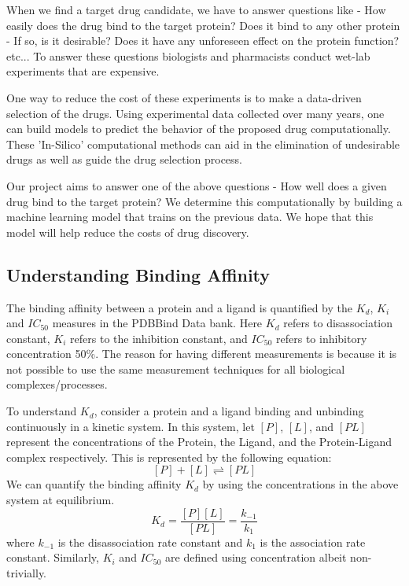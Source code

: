 \documentclass[11pt]{article}
\begin{document}
When we find a target drug candidate, we have to answer questions like - How easily does the drug bind to the target protein? Does it bind to any other protein - If so, is it desirable? Does it have any unforeseen effect on the protein function? etc...  To answer these questions biologists and pharmacists conduct wet-lab experiments that are expensive.

One way to reduce the cost of these experiments is to make a data-driven selection of the drugs.  Using experimental data collected over many years, one can build models to predict the behavior of the proposed drug computationally.  These 'In-Silico' computational methods can aid in the elimination of undesirable drugs as well as guide the drug selection process.

Our project aims to answer one of the above questions - How well does a given drug bind to the target protein? We determine this computationally by building a machine learning model that trains on the previous data.  We hope that this model will help reduce the costs of drug discovery. 

\subsection{Understanding Binding Affinity}
The binding affinity between a protein and a ligand is quantified by the $K_d$, $K_i$ and $IC_{50}$ measures in the PDBBind Data bank.
Here $K_d$ refers to disassociation constant, $K_i$ refers to the inhibition constant, and $IC_{50}$ refers to 
inhibitory concentration 50\%.
The reason for having different measurements is because it is not possible to use the same measurement techniques
for all biological complexes/processes.

To understand $K_d$, consider a protein and a ligand binding and unbinding continuously in a kinetic system.
In this system, let $[P]$, $[L]$, and $[PL]$ represent the concentrations of the Protein, the Ligand, and the Protein-Ligand complex respectively.
This is represented by the following equation:
$$[P] + [L] \rightleftharpoons [PL]$$
We can quantify the binding affinity $K_d$ by using the concentrations in the above system at equilibrium.
$$K_d = \frac{[P][L]}{[PL]} = \frac{k_{-1}}{k_1}$$
where $k_{-1}$ is the disassociation rate constant and $k_1$ is the association rate constant.
Similarly, $K_i$ and $IC_{50}$ are defined using concentration albeit non-trivially. 
\cite{binding_affinity_description}
\end{document}
